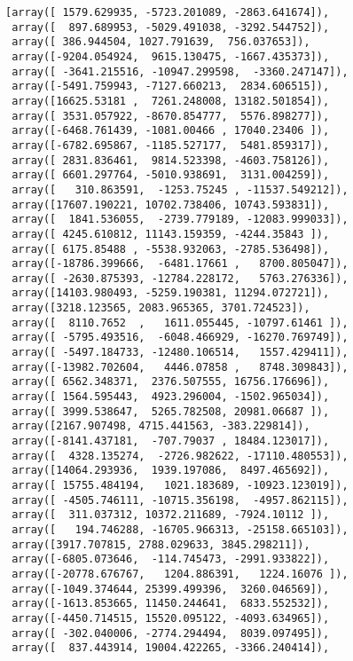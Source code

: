 \documentclass[11pt]{article}
\makeatletter
\newcommand{\boxspacing}{\kern\kvtcb@left@rule\kern\kvtcb@boxsep}
\newcommand{\prompt}[4]{
        {\ttfamily\llap{{\color{#2}[#3]:\hspace{3pt}#4}}\vspace{-\baselineskip}}
    }
\makeatother
\begin{document}
            \begin{tcolorbox}[breakable, size=fbox, boxrule=.5pt, pad at break*=1mm, opacityfill=0]
\prompt{Out}{outcolor}{8}{\boxspacing}
\begin{Verbatim}[commandchars=\\\{\}]
[array([ 1579.629935, -5723.201089, -2863.641674]),
 array([  897.689953, -5029.491038, -3292.544752]),
 array([ 386.944504, 1027.791639,  756.037653]),
 array([-9204.054924,  9615.130475, -1667.435373]),
 array([ -3641.215516, -10947.299598,  -3360.247147]),
 array([-5491.759943, -7127.660213,  2834.606515]),
 array([16625.53181 ,  7261.248008, 13182.501854]),
 array([ 3531.057922, -8670.854777,  5576.898277]),
 array([-6468.761439, -1081.00466 , 17040.23406 ]),
 array([-6782.695867, -1185.527177,  5481.859317]),
 array([ 2831.836461,  9814.523398, -4603.758126]),
 array([ 6601.297764, -5010.938691,  3131.004259]),
 array([   310.863591,  -1253.75245 , -11537.549212]),
 array([17607.190221, 10702.738406, 10743.593831]),
 array([  1841.536055,  -2739.779189, -12083.999033]),
 array([ 4245.610812, 11143.159359, -4244.35843 ]),
 array([ 6175.85488 , -5538.932063, -2785.536498]),
 array([-18786.399666,  -6481.17661 ,   8700.805047]),
 array([ -2630.875393, -12784.228172,   5763.276336]),
 array([14103.980493, -5259.190381, 11294.072721]),
 array([3218.123565, 2083.965365, 3701.724523]),
 array([  8110.7652  ,   1611.055445, -10797.61461 ]),
 array([ -5795.493516,  -6048.466929, -16270.769749]),
 array([ -5497.184733, -12480.106514,   1557.429411]),
 array([-13982.702604,   4446.07858 ,   8748.309843]),
 array([ 6562.348371,  2376.507555, 16756.176696]),
 array([ 1564.595443,  4923.296004, -1502.965034]),
 array([ 3999.538647,  5265.782508, 20981.06687 ]),
 array([2167.907498, 4715.441563, -383.229814]),
 array([-8141.437181,  -707.79037 , 18484.123017]),
 array([  4328.135274,  -2726.982622, -17110.480553]),
 array([14064.293936,  1939.197086,  8497.465692]),
 array([ 15755.484194,   1021.183689, -10923.123019]),
 array([ -4505.746111, -10715.356198,  -4957.862115]),
 array([  311.037312, 10372.211689, -7924.10112 ]),
 array([   194.746288, -16705.966313, -25158.665103]),
 array([3917.707815, 2788.029633, 3845.298211]),
 array([-6805.073646,  -114.745473, -2991.933822]),
 array([-20778.676767,   1204.886391,   1224.16076 ]),
 array([-1049.374644, 25399.499396,  3260.046569]),
 array([-1613.853665, 11450.244641,  6833.552532]),
 array([-4450.714515, 15520.095122, -4093.634965]),
 array([ -302.040006, -2774.294494,  8039.097495]),
 array([  837.443914, 19004.422265, -3366.240414]),

\end{Verbatim}
\end{tcolorbox}
\end{document}
